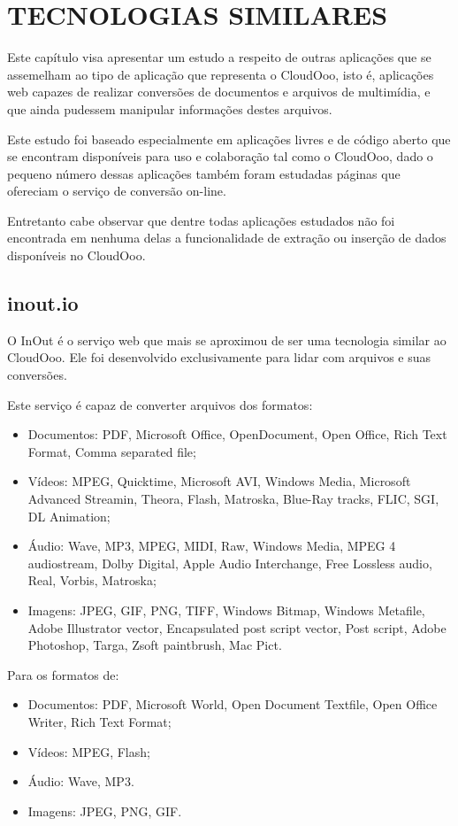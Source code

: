 \chapter{TECNOLOGIAS SIMILARES}
\thispagestyle{empty}

Este capítulo visa apresentar um estudo a respeito de outras aplicações que se assemelham ao tipo de aplicação que representa o CloudOoo, isto é, aplicações web capazes de realizar conversões de documentos e arquivos de multimídia, e que ainda pudessem manipular informações destes arquivos.

Este estudo foi baseado especialmente em aplicações livres e de código aberto que se encontram disponíveis para uso e colaboração tal como o CloudOoo, dado o pequeno número dessas aplicações também foram estudadas páginas que ofereciam o serviço de conversão on-line.

Entretanto cabe observar que dentre todas aplicações estudados não foi encontrada em nenhuma delas a funcionalidade de extração ou inserção de dados disponíveis no CloudOoo.


\section{inout.io}

O InOut é o serviço web que mais se aproximou de ser uma tecnologia similar ao CloudOoo. Ele foi desenvolvido exclusivamente para lidar com arquivos e suas conversões.

Este serviço é capaz de converter arquivos dos formatos:
\begin{itemize}
    \item{Documentos: PDF, Microsoft Office, OpenDocument, Open Office, Rich Text Format, Comma separated file;}
    \item{Vídeos: MPEG, Quicktime, Microsoft AVI, Windows Media, Microsoft Advanced Streamin, Theora, Flash, Matroska, Blue-Ray tracks,  FLIC, SGI, DL Animation;}
    \item{Áudio: Wave, MP3, MPEG, MIDI, Raw, Windows Media, MPEG 4 audiostream, Dolby Digital, Apple Audio Interchange, Free Lossless audio, Real, Vorbis, Matroska;}
    \item{Imagens: JPEG, GIF, PNG, TIFF, Windows Bitmap, Windows Metafile, Adobe Illustrator vector, Encapsulated post script vector, Post script, Adobe Photoshop, Targa, Zsoft paintbrush, Mac Pict.}
\end{itemize}


Para os formatos de:
\begin{itemize}
    \item{Documentos: PDF, Microsoft World, Open Document Textfile, Open Office Writer, Rich Text Format;}
    \item{Vídeos: MPEG, Flash;}
    \item{Áudio: Wave, MP3.}
    \item{Imagens: JPEG, PNG, GIF.}
\end{itemize}

